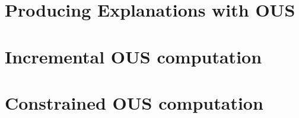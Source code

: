 \documentclass[letterpaper]{article} %
\newcommand\m[1]{\ensuremath{\mathcal{#1}}}
\newcommand\ignore[1]{}
\newcommand\comment[1]{\marginpar{\parbox{\marginparwidth}{\tiny #1}}}
\newcommand{\todo}[1]{{\comment{\color{red}\textsc{TODO:}#1} }}
\newcommand\formula{\ensuremath{\m{F} }\xspace}
\newcommand\mm[1]{\ensuremath{#1}\xspace}
\newcommand\call[1]{\mm{\textsc{#1}}}
\newcommand\sat{\mm{\call{sat}}}
\newcommand\grow{\mm{\call{Grow}}}
\newcommand\comus{\mm{\call{c-OUS}}}
\renewcommand{\todo}[1]{{\comment{\color{red}\textsc{TODO:}#1} }}
\begin{document}
\section{Producing Explanations with OUS}\label{sec:Greedy}\label{sec:explain}



\section{Incremental OUS computation} \label{sec:incremental}


\section{Constrained OUS computation} \label{sec:constrained}


\ignore{
\section{Implementation considerations}\label{sec:impl}
\todo{REMOVE}
REMOVE
When we check the satisfiability of a set $\F'$ we initialise the polarity of the literals to $I_{end}$. We use assumptions to keep the solver warm across different sets $\F'$.

The implementation of \grow can be achieved in different ways.
In our algorithms we use the model found by the $\sat(\F')$ call and let a MaxSAT solver complete it to a full assignment over $\F$. Our custom implementations of a greedy grow were consistently outperformed by the MaxSAT call. We believe this is because typically only a fraction of literals of $\F$ are left unassigned in the model of $\F'$ and a MaxSAT solver has highly optimized data-structures to manage $\F$.  %

In $\comus$, we keep the MIP solver warm and reuse it across all $\comus$ calls. We only ever add constraints to the solver. To handle the changes in $p$ with respect to literals that cannot be chosen, we enforce this by temporarily setting the objective weight to $+\infty$ for literals.
}

% 
\end{document}
